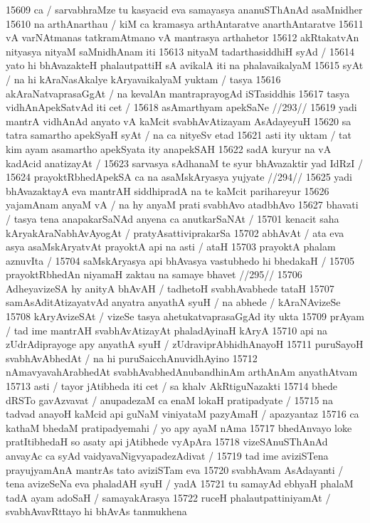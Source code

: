 15609 ca / sarvabhraMze tu kasyacid eva samayasya ananuSThAnAd asaMnidher 
15610 na arthAnarthau / kiM ca kramasya arthAntaratve anarthAntaratve 
15611 vA varNAtmanas tatkramAtmano vA mantrasya arthahetor
15612 akRtakatvAn nityasya nityaM saMnidhAnam iti  
15613 	nityaM tadarthasiddhiH syAd /
15614 yato hi bhAvazakteH phalautpattiH sA avikalA iti na phalavaikalyaM  
15615 syAt / na hi kAraNasAkalye kAryavaikalyaM yuktam / tasya
15616 akAraNatvaprasaGgAt / na kevalAn mantraprayogAd iSTasiddhis
15617 tasya vidhAnApekSatvAd iti cet /  
15618 	asAmarthyam apekSaNe //293// 
15619 yadi mantrA vidhAnAd anyato vA kaMcit svabhAvAtizayam AsAdayeyuH 
15620 sa tatra samartho apekSyaH syAt / na ca nityeSv etad
15621 asti ity uktam / tat kim ayam asamartho apekSyata ity anapekSAH 
15622 sadA kuryur na vA kadAcid anatizayAt /  
15623 	sarvasya sAdhanaM te syur bhAvazaktir yad IdRzI /
15624 	prayoktRbhedApekSA ca na asaMskAryasya yujyate //294// 
15625 yadi bhAvazaktayA eva mantrAH siddhipradA na te kaMcit parihareyur  
15626 yajamAnam anyaM vA / na hy anyaM prati svabhAvo atadbhAvo
15627 bhavati / tasya tena anapakarSaNAd anyena ca anutkarSaNAt / 
15701 kenacit saha kAryakAraNabhAvAyogAt / pratyAsattiviprakarSa 
15702 abhAvAt / ata eva asya asaMskAryatvAt prayoktA api na asti / ataH 
15703 prayoktA phalam aznuvIta / 
15704 	saMskAryasya api bhAvasya vastubhedo hi bhedakaH / 
15705 	prayoktRbhedAn niyamaH zaktau na samaye bhavet //295// 
15706 AdheyavizeSA hy anityA bhAvAH / tadhetoH svabhAvabhede tataH
15707 samAsAditAtizayatvAd anyatra anyathA syuH / na abhede / kAraNAvizeSe
15708 kAryAvizeSAt / vizeSe tasya ahetukatvaprasaGgAd ity ukta  
15709 prAyam / tad ime mantrAH svabhAvAtizayAt phaladAyinaH kAryA
15710 api na zUdrAdiprayoge apy anyathA syuH / zUdraviprAbhidhAnayoH
15711 puruSayoH svabhAvAbhedAt / na hi puruSaicchAnuvidhAyino 
15712 nAmavyavahArabhedAt svabhAvabhedAnubandhinAm arthAnAm anyathAtvam
15713 asti / tayor jAtibheda iti cet / sa khalv AkRtiguNazakti
15714 bhede dRSTo gavAzvavat / anupadezaM ca enaM lokaH pratipadyate / 
15715 na tadvad anayoH kaMcid api guNaM viniyataM pazyAmaH / apazyantaz  
15716 ca kathaM bhedaM pratipadyemahi / yo apy ayaM nAma 
15717 bhedAnvayo loke pratItibhedaH so asaty api jAtibhede vyApAra  
15718 vizeSAnuSThAnAd anvayAc ca syAd vaidyavaNigvyapadezAdivat /
15719 tad ime aviziSTena prayujyamAnA mantrAs tato aviziSTam eva 
15720 svabhAvam AsAdayanti / tena avizeSeNa eva phaladAH syuH / yadA 
15721 tu samayAd ebhyaH phalaM tadA ayam adoSaH / samayakArasya  
15722 ruceH phalautpattiniyamAt / svabhAvavRttayo hi bhAvAs tanmukhena  
